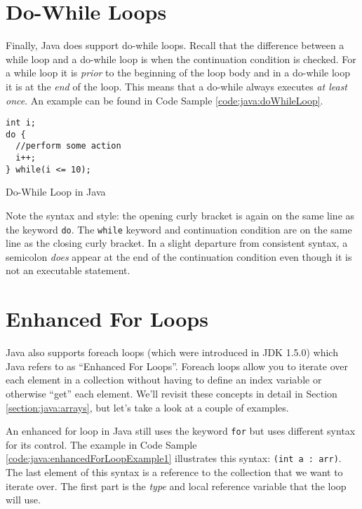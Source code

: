 \section{Do-While Loops}

Finally, Java does support do-while loops.  Recall that the difference between a
while loop and a do-while loop is when the continuation condition is checked.
For a while loop it is \emph{prior} to the beginning of the loop body and in
a do-while loop it is at the \emph{end} of the loop.  This means that a do-while 
always executes \emph{at least once}.  An example can be found in Code
Sample \ref{code:java:doWhileLoop}.

\begin{listing}
\begin{verbatim}
int i;
do {
  //perform some action
  i++;
} while(i <= 10);
\end{verbatim}
  \caption{Do-While Loop in Java}
  \label{code:java:doWhileLoop}
\end{listing}

Note the syntax and style: the opening curly bracket is again on the same
line as the keyword \texttt{do}.  The \texttt{while} keyword and
continuation condition are on the same line as the closing curly bracket.
In a slight departure from consistent syntax, a semicolon \emph{does} appear
at the end of the continuation condition even though it is not an
executable statement.

\section{Enhanced For Loops}

Java also supports foreach loops (which were introduced in JDK 1.5.0) which
Java refers to as ``Enhanced For Loops''.  Foreach loops allow you to 
iterate over each element in a collection without having to define an index
variable or otherwise ``get'' each element.  We'll revisit these concepts
in detail in Section \ref{section:java:arrays}, but let's take a look 
at a couple of examples.

An enhanced for loop in Java still uses the keyword \texttt{for} 
but uses different syntax for its control.  The example in Code Sample 
\ref{code:java:enhancedForLoopExample1} illustrates this syntax:
\texttt{(int a : arr)}.  The last element of this syntax is
a reference to the collection that we want to iterate over.  The first
part is the \emph{type} and local reference variable that the loop
will use.  

